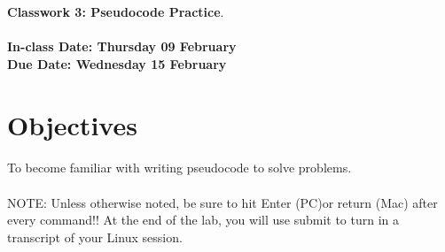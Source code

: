 \documentclass[letter,11pt]{article}
\begin{document}
\huge
\textbf{Classwork 3: Pseudocode Practice}.
\normalsize
\\ ~~ \\
\textbf{In-class Date: Thursday 09 February} \\
\textbf{Due Date: Wednesday 15 February}

\section*{Objectives}
\paragraph{}To become familiar with writing pseudocode to solve problems.
\paragraph{}NOTE: Unless otherwise noted, be sure to hit Enter (PC)or return (Mac) after every command!! At the end of the lab, you will use submit to turn in a transcript of your Linux session. %
\end{document}
